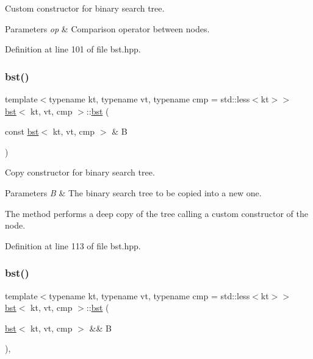 Custom constructor for binary search tree. 


\begin{DoxyParams}{Parameters}
{\em op} & Comparison operator between nodes. \\
\hline
\end{DoxyParams}


Definition at line 101 of file bst.\+hpp.

\mbox{\label{classbst_a2f94afc86338e90d9110b713383ab492}} 
\subsubsection{\texorpdfstring{bst()}{bst()}\hspace{0.1cm}{\footnotesize\ttfamily [2/3]}}
{\footnotesize\ttfamily template$<$typename kt, typename vt, typename cmp = std\+::less$<$kt$>$$>$ \\
\hyperlink{classbst}{bst}$<$ kt, vt, cmp $>$\+::\hyperlink{classbst}{bst} (\begin{DoxyParamCaption}\item[{const \hyperlink{classbst}{bst}$<$ kt, vt, cmp $>$ \&}]{B }\end{DoxyParamCaption})\hspace{0.3cm}{\ttfamily [inline]}}



Copy constructor for binary search tree. 


\begin{DoxyParams}{Parameters}
{\em B} & The binary search tree to be copied into a new one.\\
\hline
\end{DoxyParams}
The method performs a deep copy of the tree calling a custom constructor of the node. 

Definition at line 113 of file bst.\+hpp.

\mbox{\label{classbst_ac0e8f8be6be76d77809ba1d21e1be66a}} 
\subsubsection{\texorpdfstring{bst()}{bst()}\hspace{0.1cm}{\footnotesize\ttfamily [3/3]}}
{\footnotesize\ttfamily template$<$typename kt, typename vt, typename cmp = std\+::less$<$kt$>$$>$ \\
\hyperlink{classbst}{bst}$<$ kt, vt, cmp $>$\+::\hyperlink{classbst}{bst} (\begin{DoxyParamCaption}\item[{\hyperlink{classbst}{bst}$<$ kt, vt, cmp $>$ \&\&}]{B }\end{DoxyParamCaption})\hspace{0.3cm}{\ttfamily [inline]}, {\ttfamily [noexcept]}}



